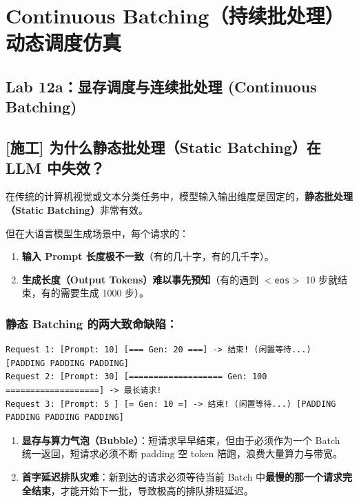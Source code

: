 \chapter{Continuous Batching（持续批处理）动态调度仿真}

\section{Lab 12a：显存调度与连续批处理 (Continuous Batching)}

\section{[施工] 为什么静态批处理（Static Batching）在 LLM 中失效？}

在传统的计算机视觉或文本分类任务中，模型输入输出维度是固定的，\textbf{静态批处理（Static Batching）}非常有效。

但在大语言模型生成场景中，每个请求的：
\begin{enumerate}
  \item \textbf{输入 Prompt 长度极不一致}（有的几十字，有的几千字）。
  \item \textbf{生成长度（Output Tokens）难以事先预知}（有的遇到 \texttt{$<$eos$>$} 10 步就结束，有的需要生成 1000 步）。
\end{enumerate}

\subsection{静态 Batching 的两大致命缺陷：}

\begin{lstlisting}[numbers=none]
Request 1: [Prompt: 10] [=== Gen: 20 ===] -> 结束! (闲置等待...) [PADDING PADDING PADDING]
Request 2: [Prompt: 30] [=================== Gen: 100 ===================] -> 最长请求!
Request 3: [Prompt: 5 ] [= Gen: 10 =] -> 结束! (闲置等待...) [PADDING PADDING PADDING PADDING]
\end{lstlisting}

\begin{enumerate}
  \item \textbf{显存与算力气泡（Bubble）}：短请求早早结束，但由于必须作为一个 Batch 统一返回，短请求必须不断 padding 空 token 陪跑，浪费大量算力与带宽。
  \item \textbf{首字延迟排队灾难}：新到达的请求必须等待当前 Batch 中\textbf{最慢的那一个请求完全结束}，才能开始下一批，导致极高的排队排班延迟。
\end{enumerate}

